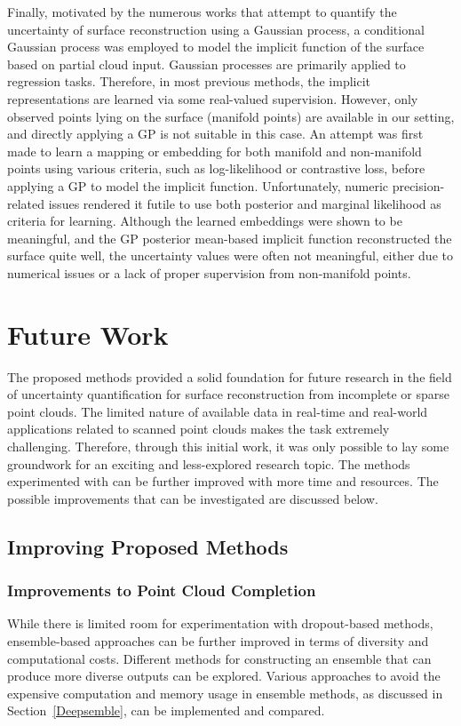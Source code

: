 Finally, motivated by the numerous works that attempt to quantify the uncertainty of surface reconstruction using a Gaussian process, a conditional Gaussian process was employed to model the implicit function of the surface based on partial cloud input. Gaussian processes are primarily applied to regression tasks. Therefore, in most previous methods, the implicit representations are learned via some real-valued supervision. However, only observed points lying on the surface (manifold points) are available in our setting, and directly applying a GP is not suitable in this case. An attempt was first made to learn a mapping or embedding for both manifold and non-manifold points using various criteria, such as log-likelihood or contrastive loss, before applying a GP to model the implicit function. Unfortunately, numeric precision-related issues rendered it futile to use both posterior and marginal likelihood as criteria for learning. Although the learned embeddings were shown to be meaningful, and the GP posterior mean-based implicit function reconstructed the surface quite well, the uncertainty values were often not meaningful, either due to numerical issues or a lack of proper supervision from non-manifold points.



\section{Future Work}
The proposed methods provided a solid foundation for future research in the field of uncertainty quantification for surface reconstruction from incomplete or sparse point clouds. The limited nature of available data in real-time and real-world applications related to scanned point clouds makes the task extremely challenging. Therefore, through this initial work, it was only possible to lay some groundwork for an exciting and less-explored research topic. The methods experimented with can be further improved with more time and resources. The possible improvements that can be investigated are discussed below.

    \subsection{Improving Proposed Methods}
        \subsubsection{Improvements to Point Cloud Completion}
        While there is limited room for experimentation with dropout-based methods, ensemble-based approaches can be further improved in terms of diversity and computational costs. Different methods for constructing an ensemble that can produce more diverse outputs can be explored. Various approaches to avoid the expensive computation and memory usage in ensemble methods, as discussed in Section~\ref{Deepsemble}, can be implemented and compared.
        \newline
        
